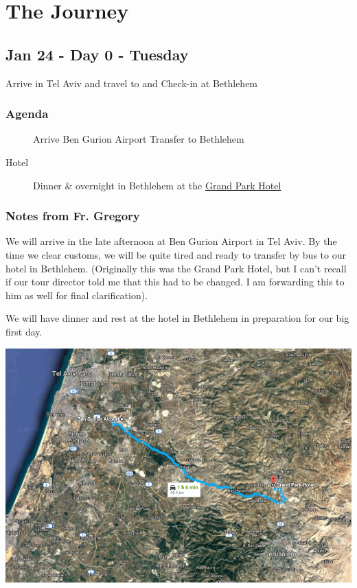 \documentclass[letterpaper]{report}
\begin{document}
\chapter{The Journey}
\section{Jan 24 - Day 0 - Tuesday}
Arrive in Tel Aviv and travel to and Check-in at Bethlehem

\subsection{Agenda}
\begin{description}
  \item[] Arrive Ben Gurion Airport Transfer to Bethlehem
  \item[Hotel] Dinner \& overnight in Bethlehem at the
    \href{http://www.grandpark.com/bethlehem/}{Grand Park Hotel}
\end{description}

\subsection{Notes from Fr. Gregory}
We will arrive in the late afternoon at Ben Gurion Airport in Tel Aviv.
By the time we clear customs, we will be quite tired and ready to transfer by bus 
to our hotel in Bethlehem.
(Originally this was the Grand Park Hotel, but I can't recall if our tour 
director told me that this had to be changed.
I am forwarding this to him as well for final clarification).


We will have dinner and rest at the hotel in Bethlehem in preparation for our
big first day.

\includegraphics[width=\textwidth]{AirportToHotel}
\end{document}
